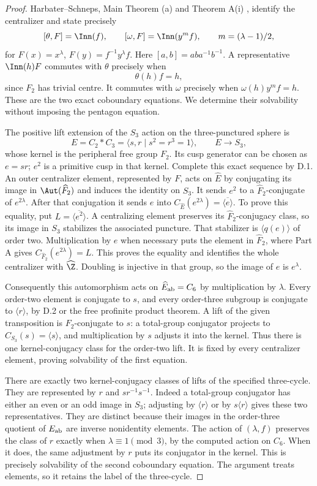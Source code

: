 \begin{proof}
Harbater--Schneps, Main Theorem (a) and Theorem A(i) \cite{R-HS}, identify the centralizer and state precisely
\[
 [\theta,F]=\Inn(f),\qquad
 [\omega,F]=\Inn(y^mf),\qquad m=(\lambda-1)/2,
\]
for $F(x)=x^\lambda$, $F(y)=f^{-1}y^\lambda f$. Here $[a,b]=aba^{-1}b^{-1}$. A representative $\Inn(h)F$ commutes with $\theta$ precisely when
\[
 \theta(h)f=h,
\]
since $F_2$ has trivial centre. It commutes with $\omega$ precisely when $\omega(h)y^mf=h$. These are the two exact coboundary equations. We determine their solvability without imposing the pentagon equation.

The positive lift extension of the $S_3$ action on the three-punctured sphere is
\[
 E=C_2*C_3=\langle s,r\mid s^2=r^3=1\rangle,
 \qquad E\longrightarrow S_3,
\]
whose kernel is the peripheral free group $F_2$. Its cusp generator can be chosen as $e=sr$; $e^2$ is a primitive cusp in that kernel. Complete this exact sequence by D.1. An outer centralizer element, represented by $F$, acts on $\widehat E$ by conjugating its image in $\Aut(\widehat F_2)$ and induces the identity on $S_3$. It sends $e^2$ to a $\widehat F_2$-conjugate of $e^{2\lambda}$. After that conjugation it sends $e$ into $C_{\widehat E}(e^{2\lambda})=\overline{\langle e\rangle}$. To prove this equality, put $L=\overline{\langle e^2\rangle}$. A centralizing element preserves its $\widehat F_2$-conjugacy class, so its image in $S_3$ stabilizes the associated puncture. That stabilizer is $\langle q(e)\rangle$ of order two. Multiplication by $e$ when necessary puts the element in $\widehat F_2$, where Part A gives $C_{\widehat F_2}(e^{2\lambda})=L$. This proves the equality and identifies the whole centralizer with $\widehat\Z$. Doubling is injective in that group, so the image of $e$ is $e^\lambda$.

Consequently this automorphism acts on $\widehat E_{\rm ab}=C_6$ by multiplication by $\lambda$. Every order-two element is conjugate to $s$, and every order-three subgroup is conjugate to $\langle r\rangle$, by D.2 or the free profinite product theorem. A lift of the given transposition is $F_2$-conjugate to $s$: a total-group conjugator projects to $C_{S_3}(s)=\langle s\rangle$, and multiplication by $s$ adjusts it into the kernel. Thus there is one kernel-conjugacy class for the order-two lift. It is fixed by every centralizer element, proving solvability of the first equation.

There are exactly two kernel-conjugacy classes of lifts of the specified three-cycle. They are represented by $r$ and $s r^{-1}s^{-1}$. Indeed a total-group conjugator has either an even or an odd image in $S_3$; adjusting by $\langle r\rangle$ or by $s\langle r\rangle$ gives these two representatives. They are distinct because their images in the order-three quotient of $E_{\rm ab}$ are inverse nonidentity elements. The action of $(\lambda,f)$ preserves the class of $r$ exactly when $\lambda\equiv1\pmod3$, by the computed action on $C_6$. When it does, the same adjustment by $r$ puts its conjugator in the kernel. This is precisely solvability of the second coboundary equation. The argument treats elements, so it retains the label of the three-cycle.


\end{proof}
